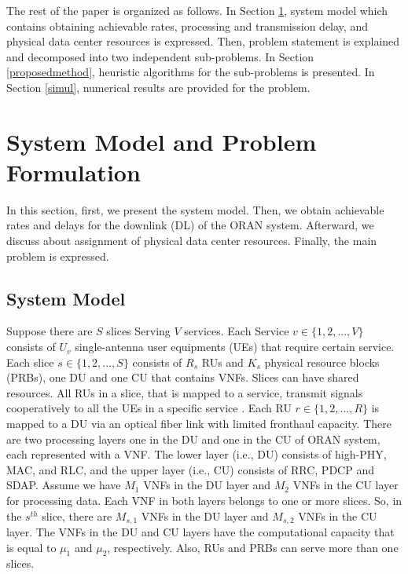 \documentclass[conference]{IEEEtran}
\begin{document}
The rest of the paper is organized as follows. In Section \ref{systemmodel}, system model which contains obtaining achievable rates, processing and transmission delay, and physical data center resources is expressed. Then, problem statement is explained and decomposed into two independent sub-problems.
In Section \ref{proposedmethod}, heuristic algorithms for the sub-problems is presented. In Section \ref{simul}, numerical results are provided for the problem.


\section{System Model and Problem Formulation}\label{systemmodel}

In this section, first, we  present the system model. Then, we obtain achievable rates and delays for the downlink (DL) of the ORAN system. Afterward, we discuss about assignment of physical data center resources.
Finally, the main problem is expressed.
\subsection{System Model}
Suppose there are $S$ slices Serving $V$ services. Each Service $v\in \{1,2,...,V \} $ consists of $U_v$
single-antenna user equipments (UEs) that require certain service. Each slice $s \in \{1,2,...,S \}$ consists of $R_s$ RUs and $K_s$ physical resource blocks (PRBs), one DU and one CU that contains VNFs.
Slices can have shared resources. All RUs in a slice, that is mapped to a service, transmit signals cooperatively to all the UEs in a specific service \cite{motalleb2017optimal,mimoCran}. Each RU $r \in \{1,2,...,R \}$ is mapped to a DU via an optical fiber link with limited fronthaul capacity.
There are two processing layers one in the DU and one in the CU of ORAN system, each represented with a VNF. The lower layer (i.e., DU) consists of high-PHY, MAC, and RLC, and the upper layer (i.e., CU) consists of RRC, PDCP and SDAP. Assume we have $M_1$ VNFs in the DU layer and $M_2$ VNFs in the CU layer for processing data.
Each VNF in both layers belongs to one or more slices. So, in the $s^{th}$ slice, there are $M_{s,1}$ VNFs in the DU layer and $M_{s,2}$ VNFs in the CU layer. The VNFs in the DU and CU layers have the computational capacity that is  equal to $\mu_1$ and $\mu_2$, respectively.
Also, RUs and PRBs can serve more than one slices.
\end{document}
